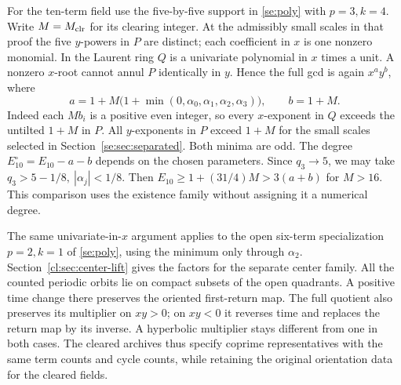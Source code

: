 For the ten-term field use the five-by-five support in \eqref{se:poly} with \(p=3,k=4\). Write \(M=M_{\mathrm{clr}}\) for its clearing integer. At the admissibly small scales in that proof the five \(y\)-powers in \(P\) are distinct; each coefficient in \(x\) is one nonzero monomial. In the Laurent ring \(Q\) is a univariate polynomial in \(x\) times a unit. A nonzero \(x\)-root cannot annul \(P\) identically in \(y\). Hence the full gcd is again \(x^a y^b\), where
\[
 a=1+M\bigl(1+\min(0,\alpha_0,\alpha_1,\alpha_2,\alpha_3)\bigr),\qquad b=1+M.
\]
Indeed each \(Mb_i\) is a positive even integer, so every \(x\)-exponent in \(Q\) exceeds the untilted \(1+M\) in \(P\). All \(y\)-exponents in \(P\) exceed \(1+M\) for the small scales selected in Section~\ref{se:sec:separated}. Both minima are odd. The degree \(E_{10}^{\circ}=E_{10}-a-b\) depends on the chosen parameters. Since \(q_3\to5\), we may take \(q_3>5-1/8,\ |\alpha_j|<1/8\). Then \(E_{10}\ge 1+(31/4)M>3(a+b)\) for \(M>16\). This comparison uses the existence family without assigning it a numerical degree.

The same univariate-in-\(x\) argument applies to the open six-term specialization \(p=2,k=1\) of \eqref{se:poly}, using the minimum only through \(\alpha_2\). Section~\ref{cl:sec:center-lift} gives the factors for the separate center family. All the counted periodic orbits lie on compact subsets of the open quadrants. A positive time change there preserves the oriented first-return map. The full quotient also preserves its multiplier on \(xy>0\); on \(xy<0\) it reverses time and replaces the return map by its inverse. A hyperbolic multiplier stays different from one in both cases. The cleared archives thus specify coprime representatives with the same term counts and cycle counts, while retaining the original orientation data for the cleared fields.
